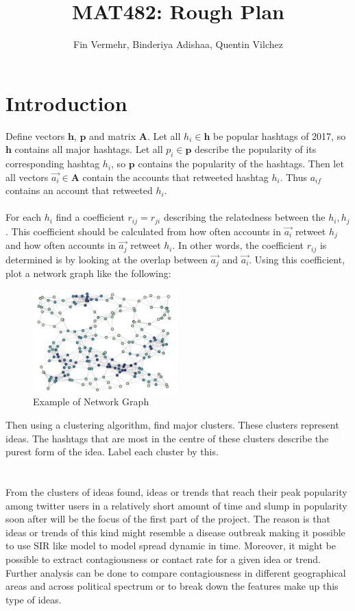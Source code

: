 \documentclass[11pt]{article}
\theoremstyle{plain}
\theoremstyle{definition}
\begin{document}
 


\title{MAT482: Rough Plan}
\author{Fin Vermehr, Binderiya Adishaa, Quentin Vilchez}
\maketitle

\section{Introduction}

Define vectors $\textbf{h}$, $\textbf{p}$ and matrix $\textbf{A}$. Let all $ h_i \in \textbf{h}$ be popular hashtags of 2017, so $\textbf{h}$ contains all major hashtags. Let all $p_i \in \textbf{p}$ describe the popularity of its corresponding hashtag $h_i$, so $\textbf{p}$ contains the popularity of the hashtags. Then let all vectors $\vec{a_i} \in \textbf{A}$ contain the accounts that retweeted hashtag $h_i$. Thus $a_{if}$ contains an account that retweeted $h_i$.\\
\\
For each $h_i$ find a coefficient $r_{ij} = r_{ji}$ describing the relatedness between the $h_i, h_j$. This coefficient should be calculated from how often accounts in $\vec{a_i}$ retweet $h_j$ and how often accounts in $\vec{a_j}$ retweet $h_i$. In other words, the coefficient ${r}_{ij}$ is determined is by looking at the overlap between $\vec{a_j}$ and $\vec{a_i}$. Using this coefficient, plot a network graph like the following:
\begin{figure}[h]
\caption{Example of Network Graph}
\centering
\includegraphics[width=0.5\textwidth]{network_graph}
\end{figure}
Then using a clustering algorithm, find major clusters. These clusters represent ideas. The hashtags that are most in the centre of these clusters describe the purest form of the idea. Label each cluster by this.\\
\\ 
\\ From the clusters of ideas found, ideas or trends that reach their peak popularity among twitter users in a relatively short amount of time and slump in popularity soon after will be the focus of the first part of the project. The reason is that ideas or trends of this kind might resemble a disease outbreak making it possible to use SIR like model to model spread dynamic in time. Moreover, it might be possible to extract contagiousness or contact rate for a given idea or trend. Further analysis can be done to compare contagiousness in different geographical areas and across political spectrum or to break down the features make up this type of ideas.
\end{document}
